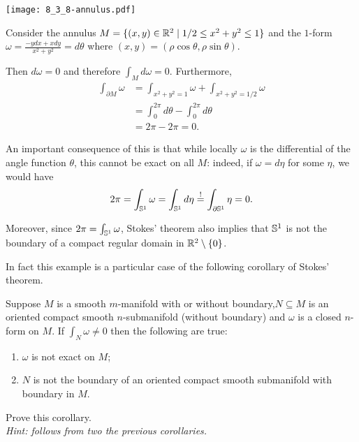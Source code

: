 \begin{example}
  \begin{marginfigure}
    \texttt{[image: 8\_3\_8-annulus.pdf]}
  \end{marginfigure}
  Consider the annulus $M=\{(x,y)\in\mathbb{R}^2 \mid 1/2\leq x^2+y^2 \leq 1\}$ and the $1$-form $\omega = \frac{-y dx + x dy}{x^2 + y^2} = d\theta$ where $(x,y) = (\rho\cos\theta, \rho\sin\theta)$.
  
  Then $d\omega = 0$ and therefore $\int_M d\omega = 0$.
  Furthermore,
  \begin{align}
    \int_{\partial M}\omega
    &= \int_{x^2 + y^2 =1} \omega + \int_{x^2+y^2 =1/2}\omega \\ 
    &= \int_{0}^{2\pi} d\theta - \int_0^{2\pi}d \theta \\
    &= 2\pi - 2\pi = 0.
  \end{align}

  An important consequence of this is that while locally $\omega$ is the differential of the angle function $\theta$, this cannot be exact on all $M$: indeed, if $\omega = d\eta$ for some $\eta$, we would have
  \begin{equation}
    2\pi = \int_{\mathbb{S}^1}\omega = \int_{\mathbb{S}^1}d\eta \overset{!}{=} \int_{\partial\mathbb{S}^1}\eta = 0.
  \end{equation}

  Moreover, since $2\pi = \int_{\mathbb{S}^1}\omega$, Stokes' theorem also implies that $\mathbb{S}^1$ is not the boundary of a compact regular domain in $\mathbb{R}^2\setminus\{0\}$.
\end{example}

In fact this example is a particular case of the following corollary of Stokes' theorem.

\begin{corollary}
  Suppose $M$ is a smooth $m$-manifold with or without boundary,$N\subseteq M$ is an oriented compact smooth $n$-submanifold (without boundary) and $\omega$ is a closed $n$-form on $M$.
  If $\int_N\omega \neq 0$ then the following are true:
  \begin{enumerate}
    \item $\omega$ is not exact on $M$;
    \item $N$ is not the boundary of an oriented compact smooth submanifold with boundary in $M$.
  \end{enumerate}
\end{corollary}
\begin{exercise}
  Prove this corollary. \\
  \textit{\small Hint: follows from two the previous corollaries.}
\end{exercise}


